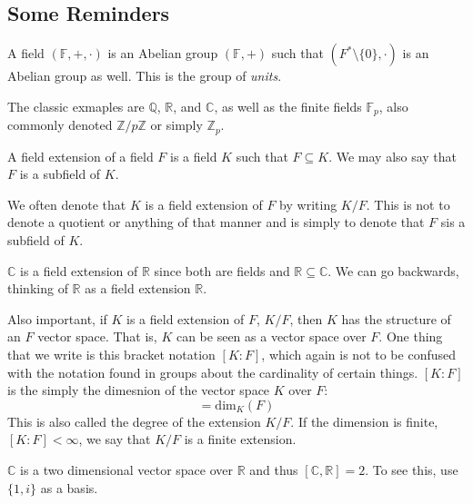 \subsection{Some Reminders}
    \begin{definition}
        A field $(\mathbb{F},+,\cdot)$ is an Abelian group
        $(\mathbb{F},+)$ such that $(F^{*}\setminus\{0\},\cdot)$ is an
        Abelian group as well. This is the group of \textit{units}.
    \end{definition}
    \begin{example}
        The classic exmaples are $\mathbb{Q}$, $\mathbb{R}$, and
        $\mathbb{C}$, as well as the finite fields $\mathbb{F}_{p}$,
        also commonly denoted $\mathbb{Z}/p\mathbb{Z}$ or simply
        $\mathbb{Z}_{p}$.
    \end{example}
    \begin{definition}
        A field extension of a field $F$ is a field $K$ such that
        $F\subseteq{K}$. We may also say that $F$ is a subfield of $K$.
    \end{definition}
    We often denote that $K$ is a field extension of $F$ by writing
    $K/F$. This is not to denote a quotient or anything of that manner
    and is simply to denote that $F$ sis a subfield of $K$.
    \begin{example}
        $\mathbb{C}$ is a field extension of $\mathbb{R}$ since both are
        fields and $\mathbb{R}\subseteq\mathbb{C}$. We can go backwards,
        thinking of $\mathbb{R}$ as a field extension $\mathbb{R}$.
    \end{example}
    Also important, if $K$ is a field extension of $F$, $K/F$, then
    $K$ has the structure of an $F$ vector space. That is, $K$ can be
    seen as a vector space over $F$. One thing that we write is this
    bracket notation $[K:F]$, which again is not to be confused with
    the notation found in groups about the cardinality of certain
    things. $[K:F]$ is the simply the dimesnion of the vector space
    $K$ over $F$:
    \begin{equation}
        [K:F]=\textrm{dim}_{K}(F)
    \end{equation}
    This is also called the degree of the extension $K/F$. If the
    dimension is finite, $[K:F]<\infty$, we say that $K/F$ is a finite
    extension.
    \begin{example}
        $\mathbb{C}$ is a two dimensional vector space over $\mathbb{R}$
        and thus $[\mathbb{C},\mathbb{R}]=2$. To see this, use
        $\{1,i\}$ as a basis.
    \end{example}
